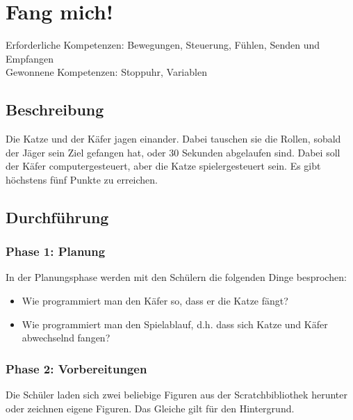 \section{Fang mich!}\label{fang-mich}

Erforderliche Kompetenzen: Bewegungen, Steuerung, Fühlen, Senden und
Empfangen\\
Gewonnene Kompetenzen: Stoppuhr, Variablen

\begin{figure}[ht]
    \centering 
    \caption[\Sectionname]{\Sectionname}
\end{figure}

\subsection{Beschreibung}\label{beschreibung}

Die Katze und der Käfer jagen einander. Dabei tauschen sie die Rollen,
sobald der Jäger sein Ziel gefangen hat, oder 30 Sekunden abgelaufen
sind. Dabei soll der Käfer computergesteuert, aber die Katze
spielergesteuert sein. Es gibt höchstens fünf Punkte zu erreichen.

\subsection{Durchführung}\label{durchfuxfchrung}

\subsubsection{Phase 1: Planung}\label{phase-1-planung}

In der Planungsphase werden mit den Schülern die folgenden Dinge
besprochen:

\begin{itemize}
\item
  Wie programmiert man den Käfer so, dass er die Katze fängt?
\item
  Wie programmiert man den Spielablauf, d.h. dass sich Katze und Käfer
  abwechselnd fangen?
\end{itemize}

\subsubsection{Phase 2: Vorbereitungen}\label{phase-2-vorbereitungen}

Die Schüler laden sich zwei beliebige Figuren aus der Scratchbibliothek
herunter oder zeichnen eigene Figuren. Das Gleiche gilt für den
Hintergrund.

